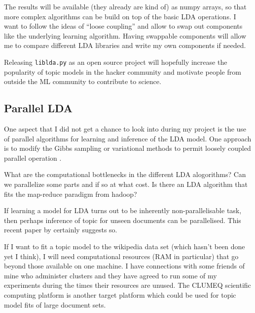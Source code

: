 \documentclass[letterpaper,11pt]{article}
\begin{document}
	    The results will be available (they already are kind of) as numpy arrays, so that
	    more complex algorithms can be build on top of the basic LDA operations.
	    I want to follow the ideas of ``loose coupling'' and allow to swap out components like
	    the underlying learning algorithm. 
	    Having swappable components will allow me to compare different LDA libraries
	    and write my own components if needed.

	    Releasing \texttt{liblda.py}  as an open source project will hopefully increase the 
	    popularity of topic models in the hacker community and motivate people from outside
	    the ML community to contribute to science.
	    

		
	\subsection{Parallel LDA}

	        One aspect that I did not get a chance to look into during my project is the use of parallel algorithms
	        for learning  and inference of the LDA model.
	        One approach is to modify the Gibbs sampling or variational methods to permit loosely
	        coupled parallel operation \cite{newman2006scalable,newman2007distributed}. 
	        
	        What are the computational bottlenecks in the different LDA alogorithms?
	        Can we parallelize some parts and if so at what cost.
	        Is there an LDA algorithm that fits the map-reduce paradigm from hadoop?
	        
	        If learning a model for LDA turns out to be inherently non-parallelisable task, then
	        perhaps inference of topic for unseen documents can be parallelised.
	        This recent paper by \cite{yao2009efficient} certainly suggests so.
	        
	        If I want to fit a topic model to the wikipedia data set (which hasn't been done yet I think),
	        I will need computational resources (RAM in particular) that go beyond those available
	        on one machine. %
	        I have connections with some friends of mine who administer clusters and they have
	        agreed to run some of my experiments during the times their resources are unused.
	        The CLUMEQ scientific computing platform is another target platform which could be 
	        used for topic model fits of large document sets.
	        
\end{document}

